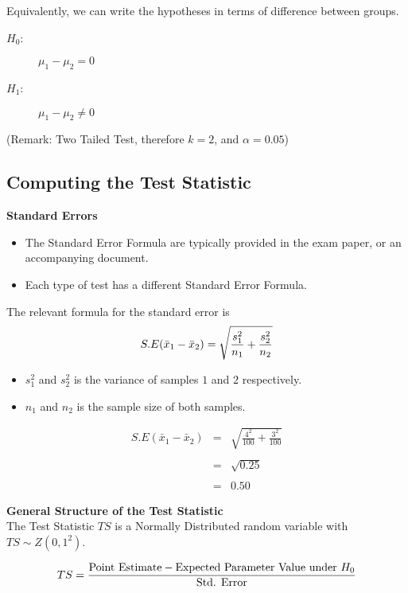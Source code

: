 \documentclass[a4paper,12pt]{article}
\begin{document}
\noindent Equivalently, we can write the hypotheses in terms of difference between groups.
\begin{description}
\item[$H_0$:] $\mu_1 - \mu_2 = 0 $ 
\item[$H_1$:] $\mu_1 - \mu_2\neq  0$ 
\end{description}



\noindent (Remark: Two Tailed Test, therefore $k = 2$, and $\alpha = 0.05$)
\newpage
\subsection*{Computing the Test Statistic}

\noindent \textbf{Standard Errors}
\begin{itemize}
    \item The Standard Error Formula are typically provided in the exam paper, or an accompanying document.
    \item Each type of test has a different Standard Error Formula.
\end{itemize}
\begin{framed}
 The relevant formula for the standard error is
\[ S.E(\bar{x}_1 - \bar{x}_2) = \sqrt{{s^2_1\over n_1}+{s^2_2 \over n_2}} \]
\end{framed}
\bigskip
\begin{itemize}
\item $s^2_1$ and $s^2_2$ is the variance of samples $1$ and $2$ respectively.
\item $n_1$ and $n_2$ is the sample size of both samples.\bigskip

\end{itemize}
\begin{eqnarray*}
 S.E(\bar{x}_1 - \bar{x}_2) &=& \sqrt{ \frac{4^2}{100} + \frac{3^2}{100} } \\
& & \\
&=& \sqrt{ 0.25  }\\
& & \\
&=& 0.50
\end{eqnarray*}
\newpage 

\noindent \textbf{General Structure of the Test Statistic}\\
\noindent The Test Statistic $TS$ is a Normally  Distributed random variable with $TS \sim Z(0,1^2)$.
\begin{framed}
\[ TS = {\mbox{Point Estimate} - \mbox{Expected Parameter Value under $H_{0}$} \over \mbox{Std. Error}}\]
\end{framed}
\end{document}
